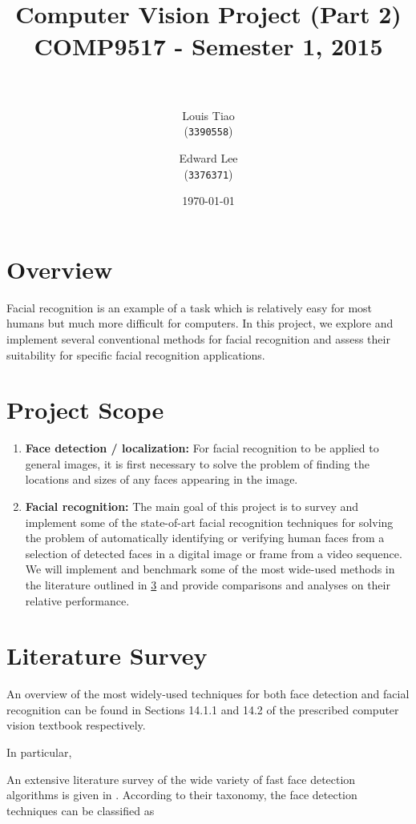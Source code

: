 \documentclass[11pt]{article} %
\title{ 
\normalfont \normalsize 
\horrule{0.5pt} \\[0.4cm] %
\Large Computer Vision Project (Part 2) \\ [0.1cm] %
\large COMP9517 - Semester 1, 2015 \\ [0.2cm]
\horrule{2pt} \\[0.5cm] %
}
\author{
  Louis Tiao \\
  (\texttt{3390558})
  \and
  Edward Lee\\
  (\texttt{3376371})
} %
\date{\normalsize\today} %
\theoremstyle{plain}
\theoremstyle{definition}
\theoremstyle{remark}
\numberwithin{equation}{section} %
\numberwithin{figure}{section} %
\numberwithin{table}{section} %
\begin{document}
\maketitle %

\section{Overview}

Facial recognition is an example of a task which is relatively easy for most humans but much more difficult for computers. In this project, we explore and implement several conventional methods for facial recognition and assess their suitability for specific facial recognition applications.

\section{Project Scope}

\begin{enumerate}
  \item \textbf{Face detection / localization:} For facial recognition to be applied to general images, it is first necessary to solve the problem of finding the locations and sizes of any faces appearing in the image.
  \item \textbf{Facial recognition:} The main goal of this project is to survey and implement some of the state-of-art facial recognition techniques for solving the problem of automatically identifying or verifying human faces from a selection of detected faces in a digital image or frame from a video sequence. We will implement and benchmark some of the most wide-used methods in the literature outlined in \cref{sec:lit_survey} and provide comparisons and analyses on their relative performance.
\end{enumerate}

\section{Literature Survey} \label{sec:lit_survey}

An overview of the most widely-used techniques for both face detection and facial recognition can be found in Sections 14.1.1 and 14.2 of the prescribed computer vision textbook \citep[p.~658,~668]{szeliski2010computer} respectively.

In particular,

An extensive literature survey of the wide variety of fast face detection 
algorithms is given in \citep{yang2002detecting}. According to their taxonomy,
the face detection techniques can be classified as
\end{document}

